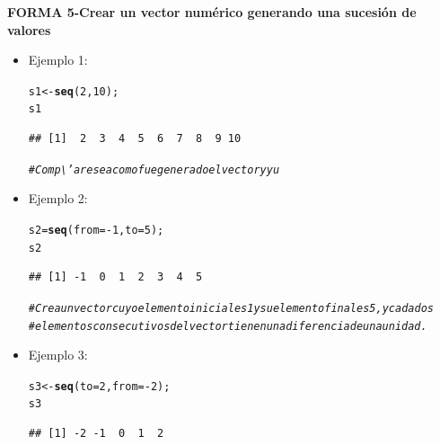 \documentclass[12pt,letterpaper]{article}\usepackage[]{graphicx}\usepackage[]{color}
\makeatletter
\newcommand{\hlnum}[1]{\textcolor[rgb]{0.686,0.059,0.569}{#1}}%
\newcommand{\hlcom}[1]{\textcolor[rgb]{0.678,0.584,0.686}{\textit{#1}}}%
\newcommand{\hlopt}[1]{\textcolor[rgb]{0,0,0}{#1}}%
\newcommand{\hlstd}[1]{\textcolor[rgb]{0.345,0.345,0.345}{#1}}%
\newcommand{\hlkwb}[1]{\textcolor[rgb]{0.69,0.353,0.396}{#1}}%
\newcommand{\hlkwc}[1]{\textcolor[rgb]{0.333,0.667,0.333}{#1}}%
\newcommand{\hlkwd}[1]{\textcolor[rgb]{0.737,0.353,0.396}{\textbf{#1}}}%
\newenvironment{kframe}{%
 \def\at@end@of@kframe{}%
 \ifinner\ifhmode%
  \def\at@end@of@kframe{\end{minipage}}%
  \begin{minipage}{\columnwidth}%
 \fi\fi%
 \def\FrameCommand##1{\hskip\@totalleftmargin \hskip-\fboxsep
 \colorbox{shadecolor}{##1}\hskip-\fboxsep
     \hskip-\linewidth \hskip-\@totalleftmargin \hskip\columnwidth}%
 \MakeFramed {\advance\hsize-\width
   \@totalleftmargin\z@ \linewidth\hsize
   \@setminipage}}%
 {\par\unskip\endMakeFramed%
 \at@end@of@kframe}
\newenvironment{knitrout}{}{} %
\makeatother
\begin{document}
\textbf{FORMA 5-Crear un vector num\'erico generando una sucesi\'on de valores}
\begin{itemize}
\item Ejemplo 1: 
\begin{knitrout}
\color{fgcolor}\begin{kframe}
\begin{alltt}
\hlstd{s1} \hlkwb{<-} \hlkwd{seq}\hlstd{(}\hlnum{2}\hlstd{,} \hlnum{10}\hlstd{);}
\hlstd{s1}
\end{alltt}
\begin{verbatim}
## [1]  2  3  4  5  6  7  8  9 10
\end{verbatim}
\begin{alltt}
\hlcom{# Comp\textbackslash{}'arese a como fue generado el vector y y u}
\end{alltt}
\end{kframe}
\end{knitrout}
\item Ejemplo 2:
\begin{knitrout}
\color{fgcolor}\begin{kframe}
\begin{alltt}
\hlstd{s2} \hlkwb{=} \hlkwd{seq}\hlstd{(}\hlkwc{from}\hlstd{=}\hlopt{-}\hlnum{1}\hlstd{,} \hlkwc{to}\hlstd{=}\hlnum{5}\hlstd{);}
\hlstd{s2}
\end{alltt}
\begin{verbatim}
## [1] -1  0  1  2  3  4  5
\end{verbatim}
\begin{alltt}
\hlcom{# Crea un vector cuyo elemento inicial es 1 y su elemento final es 5, y cada dos}
\hlcom{#elementos consecutivos del vector tienen una diferencia de una unidad.}
\end{alltt}
\end{kframe}
\end{knitrout}
\item Ejemplo 3:
\begin{knitrout}
\color{fgcolor}\begin{kframe}
\begin{alltt}
\hlstd{s3}\hlkwb{<-}\hlkwd{seq}\hlstd{(}\hlkwc{to}\hlstd{=}\hlnum{2}\hlstd{,} \hlkwc{from}\hlstd{=}\hlopt{-}\hlnum{2}\hlstd{);}
\hlstd{s3}
\end{alltt}
\begin{verbatim}
## [1] -2 -1  0  1  2
\end{verbatim}

\end{kframe}
\end{knitrout}
\end{itemize}
\end{document}
